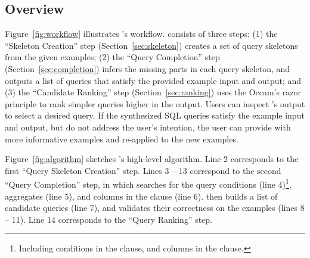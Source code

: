 \subsection{Overview}
\label{sec:algorithm}

\vspace{-1mm}

Figure~\ref{fig:workflow} illustrates \ourtool's workflow.
\ourtool consists of three steps: (1) the ``Skeleton Creation'' step (Section~\ref{sec:skeleton})
creates a set of query skeletons from the given examples;
(2) the ``Query Completion'' step (Section~\ref{sec:completion}) 
infers the missing parts in each query skeleton, and outputs
a list of queries that satisfy
the provided example input and output; and (3) the ``Candidate Ranking'' step (Section~\ref{sec:ranking}) uses the Occam's razor
principle to rank simpler queries higher in the output.
Users can inspect \ourtool's output to select a desired query.
If the synthesized SQL queries satisfy the example input and
output, but do not address the user's intention,
the user can provide \ourtool with more informative examples
and re-applied \ourtool to the new examples.


Figure~\ref{fig:algorithm} sketches \ourtool's high-level algorithm.
Line 2 corresponds to the first ``Query Skeleton
Creation'' step. Lines 3 -- 13 correspond to the second ``Query Completion''
step, in which \ourtool searches for the query conditions (line 4)\footnote{
Including conditions in the  clause,
and columns in the  clause.},
aggregates (line 5), and columns in the  clause (line 6).
\ourtool then builds a list of candidate queries (line 7), and
validates their correctness on the examples (lines 8 -- 11).
Line 14 corresponds to the ``Query Ranking'' step.


